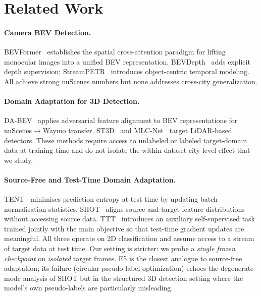 \documentclass[letterpaper, 10pt, journal]{IEEEtran}
\begin{document}
\section{Related Work}
\label{sec:related}

\paragraph{Camera BEV Detection.}
BEVFormer~\cite{li2022bevformer} establishes the spatial cross-attention paradigm
for lifting monocular images into a unified BEV representation.
BEVDepth~\cite{li2023bevdepth} adds explicit depth supervision;
StreamPETR~\cite{wang2023streampetr} introduces object-centric temporal modeling.
All achieve strong nuScenes numbers but none addresses cross-city generalization.

\paragraph{Domain Adaptation for 3D Detection.}
DA-BEV~\cite{dabev2024} applies adversarial feature alignment to BEV representations
for nuScenes$\to$Waymo transfer.
ST3D~\cite{yang2021st3d} and MLC-Net~\cite{luo2021mlc} target LiDAR-based detectors.
These methods require access to unlabeled or labeled target-domain data at training
time and do not isolate the within-dataset city-level effect that we study.

\paragraph{Source-Free and Test-Time Domain Adaptation.}
TENT~\cite{wang2021tent} minimises prediction entropy at test time by updating batch
normalisation statistics.
SHOT~\cite{liang2021shot} aligns source and target feature distributions without
accessing source data.
TTT~\cite{sun2020ttt} introduces an auxiliary self-supervised task trained jointly
with the main objective so that test-time gradient updates are meaningful.
All three operate on 2D classification and assume access to a stream of target data
at test time.
Our setting is stricter: we probe a \emph{single frozen checkpoint} on
\emph{isolated} target frames.
E5 is the closest analogue to source-free adaptation; its failure (circular
pseudo-label optimization) echoes the degenerate-mode analysis of SHOT
but in the structured 3D detection setting where the model's own pseudo-labels
are particularly misleading.
\end{document}
